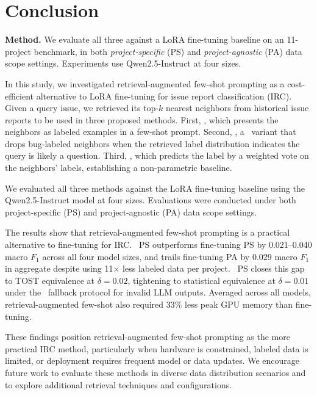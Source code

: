 
\section{Conclusion}
\label{sec:conclusion}
\textbf{Method.}  We evaluate all three against a LoRA fine-tuning baseline on an 11-project benchmark, in both \emph{project-specific} (PS) and \emph{project-agnostic} (PA) data scope settings. Experiments use Qwen2.5-Instruct at four sizes.

In this study, we investigated retrieval-augmented few-shot prompting as a cost-efficient alternative to LoRA fine-tuning for issue report classification (IRC). Given a query issue, we retrieved its top-$k$ nearest neighbors from historical issue reports to be used in three proposed methods. First, \ragtag, which presents the neighbors as labeled examples in a few-shot prompt. Second, \bragtag, a \ragtag\ variant that drops bug-labeled neighbors when the retrieved label distribution indicates the query is likely a question. Third, \votag, which predicts the label by a weighted vote on the neighbors' labels, establishing a non-parametric baseline. 

We evaluated all three methods against the LoRA fine-tuning baseline using the Qwen2.5-Instruct model at four sizes. Evaluations were conducted under both project-specific (PS) and project-agnostic (PA) data scope settings.

The results show that retrieval-augmented few-shot prompting is a practical alternative to fine-tuning for IRC. \ragtag\ PS outperforms fine-tuning PS by 0.021--0.040 macro $F_1$ across all four model sizes, and trails fine-tuning PA by 0.029 macro $F_1$ in aggregate despite using 11$\times$ less labeled data per project. \bragtag\ PS closes this gap to TOST equivalence at $\delta{=}0.02$, tightening to statistical equivalence at $\delta{=}0.01$ under the \votag\ fallback protocol for invalid LLM outputs. Averaged across all models, retrieval-augmented few-shot also required 33\% less peak GPU memory than fine-tuning.

These findings position retrieval-augmented few-shot prompting as the more practical IRC method, particularly when hardware is constrained, labeled data is limited, or deployment requires frequent model or data updates. We encourage future work to evaluate these methods in diverse data distribution scenarios and to explore additional retrieval techniques and configurations.
